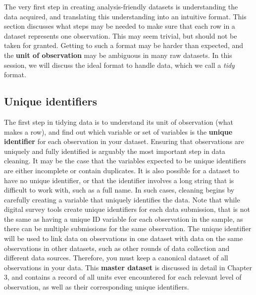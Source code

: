 The very first step in creating analysis-friendly datasets
is understanding the data acquired,
and translating this understanding into an intuitive format.
This section discusses what steps may be needed to make sure that each row
in a dataset represents one observation.
This may seem trivial, but should not be taken for granted.
Getting to such a format may be harder than expected,
and the \textbf{unit of observation}
 may be ambiguous in many raw datasets.
In this session, we will discuss the ideal format to handle data,
which we call a \textit{tidy} format.


\subsection{Unique identifiers}

The first step in tidying data is to understand its unit of observation
(what makes a row),
and find out which variable or set of variables is the \textbf{unique identifier} for each observation in your dataset.
Ensuring that observations are uniquely and fully identified
is arguably the most important step in data cleaning.
It may be the case that the variables expected to be unique identifiers are either incomplete or contain duplicates.
It is also possible for a dataset to have no unique identifier, 
or that the identifier involves a long string that is difficult to work with, such as a full name.
In such cases, cleaning begins by carefully creating a variable that uniquely identifies the data.
Note that while digital survey tools create unique identifiers for each data submission,
that is not the same as having a unique ID variable for each observation in the sample,
as there can be multiple submissions for the same observation.
The unique identifier will be used to link data on observations in one dataset 
with data on the same observations in other datasets, 
such as other rounds of data collection and different data sources.
Therefore, you must keep a canonical dataset of all observations in your data.
This \textbf{master dataset}
is discussed in detail in Chapter 3, 
and contains a record of all units ever encountered for each relevant level of observation,
as well as their corresponding unique identifiers.


